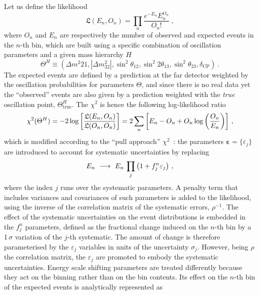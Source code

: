 \documentclass[a4paper, 11pt]{article}
\newcommand{\bs}{\boldsymbol}
\begin{document}
Let us define the likelihood
\begin{equation}
	\mathfrak{L}(E_n, O_n) = \prod_n \frac{e^{-E_n} E_n^{O_n}}{O_n!}\ ,
\end{equation}
where $O_n$ and $E_n$ are respectively the number of observed and expected events in the $n$-th bin, %
which are built using a specific combination of oscillation parameters and a given mass hierarchy $H$
\begin{equation}
	\Theta^H \equiv (\Delta m^2{21}, |\Delta m^2_{32}|, \sin^2\theta_{12}, \sin^2 2\theta_{13}, \sin^2 \theta_{23}, \delta_\text{CP})\ .
\end{equation}
The expected events are defined by a prediction at the far detector weighted by the oscillation probabilities %
for parameters $\Theta$, and since there is no real data yet the ``observed'' events are also given by %
a prediction weighted with the \emph{true} oscillation point, $\Theta^H_\text{true}$.
The $\chi^2$ is hence the following log-likelihood ratio
\begin{equation}
	\label{eq:log_ratio}
	\chi^2(\Theta^H) = -2 \log \qty[\frac{\mathfrak{L}(E_n, O_n)}{\mathfrak{L}(O_n, O_n)}] =
		2 \sum_n \qty[E_n - O_n + O_n \log \qty(\frac{O_n}{E_n})]\ ,
\end{equation}
which is modified according to the ``pull approach'' $\chi^2$~\cite{Fogli:2002pt}: %
the parameters $\bs{\varepsilon} = \{\varepsilon_j\}$ are introduced %
to account for systematic uncertainties by replacing
\begin{equation}
	\label{eq:pull}
	E_n\ \longrightarrow\ E_n\,\prod_j \qty(1 + f_j^n \varepsilon_j)\ ,
\end{equation}
where the index $j$ runs over the systematic parameters.
A penalty term that includes variances and covariances of such parameters is added to the likelihood, %
using the inverse of the correlation matrix of the systematic errors, $\rho^{-1}$.
The effect of the systematic uncertainties on the event distributions is embedded in the $f_j^n$ parameters, %
defined as the fractional change induced on the $n$-th bin by a 1\,$\sigma$ variation of the $j$-th systematic.
The amount of change is therefore parameterised by the $\varepsilon_j$ variables in units of the uncertainty $\sigma_j$.
However, being $\rho$ the correlation matrix, the $\varepsilon_j$ are promoted to embody the systematic uncertainties.
Energy scale shifting parameters are treated differently because they act on the binning rather than on the %
bin contents.
Its effect on the $n$-th bin of the expected events is analytically represented as
\end{document}

